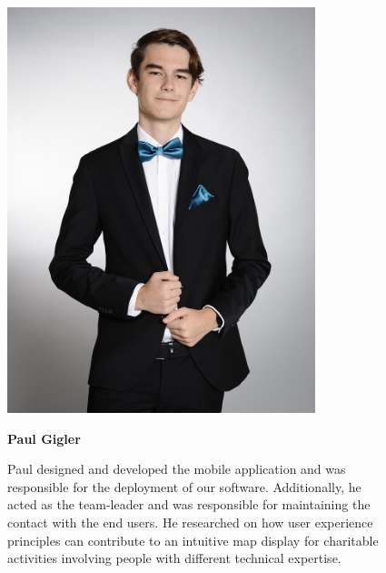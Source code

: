     \begin{figure}[H]
        \centering
        \begin{minipage}{0.35\textwidth}
            \center
            \includegraphics[width=0.8\textwidth]{images/people/paulGigler.jpeg} 
    \end{minipage}
    \hfill
        \begin{minipage}{0.6\textwidth}
          \setlength{\baselineskip}{1.5em}
          \vspace{-1em}
          \textbf{Paul Gigler}

          Paul designed and developed the mobile application and was responsible for the deployment of our software. Additionally, he acted as the team-leader and was responsible for maintaining the contact with the end users. He researched on how user experience principles can contribute to an intuitive map display for charitable activities involving people with different technical expertise.
        \end{minipage}
    \end{figure}

